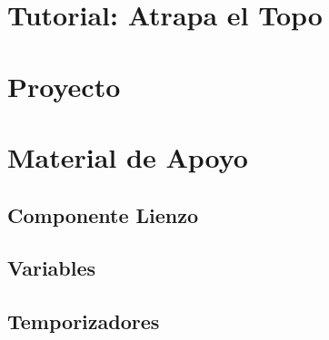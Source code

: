 \section{Tutorial: Atrapa el Topo}

\section{Proyecto}

\section{Material de Apoyo}

\subsection*{Componente Lienzo}

\subsection*{Variables}

\subsection*{Temporizadores}



